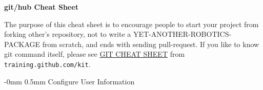 \documentclass[10pt,landscape]{article}
\makeatletter
\renewcommand{\section}{\@startsection{section}{1}{0mm}%
                                {-0mm} %
                                {0.5mm}%
                                {\normalfont\large\bfseries}}
\makeatother
\begin{document}
\raggedright
\footnotesize
\begin{multicols}{2}


\setlength{\premulticols}{1pt}
\setlength{\postmulticols}{1pt}
\setlength{\multicolsep}{1pt}
\setlength{\columnsep}{2pt}

\begin{center}
     \Large{\textbf{git/hub Cheat Sheet}} \\
\end{center}
\newlength{\MyLen}


The purpose of this cheat sheet is to encourage people to start your
project from forking other's repository, not to write
a YET-ANOTHER-ROBOTICS-PACKAGE from scratch, and ends with sending pull-request.
%
If you like to know git command itself, please see
\href{https://training.github.com/kit/downloads/github-git-cheat-sheet.pdf}{GIT
  CHEAT SHEET} from \texttt{training.github.com/kit}.

\vspace{1.5mm}
\section{Configure User Information}
\vspace{0.5mm}


\end{multicols}
\end{document}
